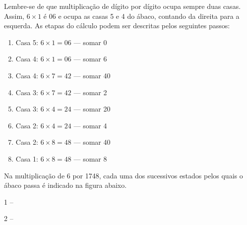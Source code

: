 \documentclass[12pt]{book}
\begin{document}
Lembre-se
de que multiplicação de dígito
por dígito ocupa sempre duas casas.
Assim, $6\times 1$ é 06 e ocupa as
casas 5 e 4 do ábaco, contando da direita
para a esquerda. As etapas do cálculo podem
ser descritas pelos seguintes passos:

\begin{enumerate}
\item Casa 5:  $6\times 1= 06$ --- somar 0
\item Casa 4: $6\times 1= 06$ --- somar 6
\item Casa 4: $6\times 7= 42$ --- somar 40
\item Casa 3: $6\times 7= 42$ --- somar 2
\item Casa 3: $6\times 4= 24$ --- somar 20
\item Casa 2: $6\times 4= 24$ --- somar 4
\item Casa 2: $6\times 8= 48$ --- somar 40
\item Casa 1: $6\times 8= 48$ --- somar 8
\end{enumerate}

Na multiplicação de 6 por 1748,
cada uma dos sucessivos
estados pelos quais o ábaco passa
é indicado na figura abaixo.

\vspace{0.2cm}
\begin{minipage}{0.5\textwidth}
1 --
\end{minipage}%
%
\begin{minipage}{0.4\textwidth}
2 -- 
\end{minipage}
\end{document}
